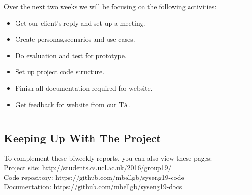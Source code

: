\documentclass[11pt]{report}
\begin{document}
\noindent
Over the next two weeks we will be focusing on the following activities:

\begin{itemize}
    \item Get our client’s reply and set up a meeting.
    \item Create personas,scenarios and use cases.
    \item Do evaluation and test for prototype.
    \item Set up project code structure.
    \item Finish all documentation required for website.
    \item Get feedback for website from our TA.
\end{itemize}

\hrule

\subsection*{Keeping Up With The Project}

To complement these biweekly reports, you can also view these pages:\\

\noindent
Project site: http://students.cs.ucl.ac.uk/2016/group19/\\

\noindent
Code repository: https://github.com/mbellgb/syseng19-code\\

\noindent
Documentation: https://github.com/mbellgb/syseng19-docs
\end{document}

